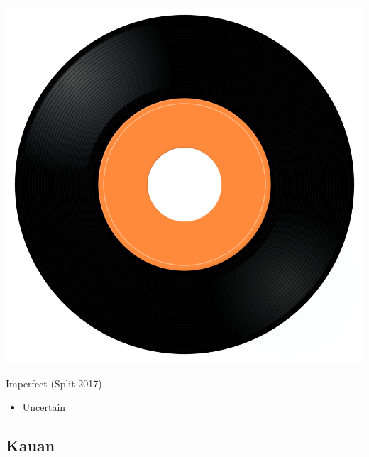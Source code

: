 \begin{minipage}[t]{0.25\textwidth}
\captionsetup{type=figure}
\includegraphics[width=\textwidth]{Images/cover.png}
\caption*{Imperfect (Split 2017)}
\end{minipage}
\begin{minipage}[t]{0.25\textwidth}\vspace{0pt}
\begin{itemize}[nosep,leftmargin=1em,labelwidth=*,align=left]
	\setlength{\itemsep}{0pt}
	\item Uncertain
\end{itemize}
\end{minipage}

\subsection{Kauan}

